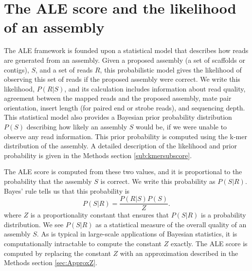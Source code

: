 \documentclass[phd,tocprelim]{cornell}
\begin{document}
\section{The ALE score and the likelihood of an assembly}
The ALE framework is founded upon a statistical model that describes how reads are generated from an assembly.  Given a proposed assembly (a set of scaffolds or contigs), $S$, and a set of reads $R$, this probabilistic model gives the likelihood of observing this set of reads if the proposed assembly were correct.  We write this likelihood, $P(R|S)$, and its calculation includes information about read quality, agreement between the mapped reads and the proposed assembly, mate pair orientation, insert length (for paired end or strobe reads), and sequencing depth.  This statistical model also provides a Bayesian prior probability distribution $P(S)$ describing how likely an assembly $S$ would be, if we were unable to observe any read information.   This prior probability is computed using the k-mer distribution of the assembly.  A detailed description of the likelihood and prior probability is given in the Methods section \ref{sub:kmersubscore}.

The ALE score is computed from these two values, and it is proportional to the probability that the assembly $S$ is correct.  We write this probability as $P(S|R)$.  Bayes' rule tells us that this probability is 
\begin{equation}
    P(S|R) = \frac{P(R|S)P(S)}{Z}.
\end{equation}
where $Z$ is a proportionality constant that ensures that $P(S|R)$ is a probability distribution.  We see $P(S|R)$ as a statistical measure of the overall quality of an assembly $S$.  As is typical in large-scale applications of Bayesian statistics, it is computationally intractable to compute the constant $Z$ exactly.  The ALE score is computed by replacing the constant $Z$ with an approximation described in the Methods section \ref{sec:ApproxZ}. 
\end{document}
